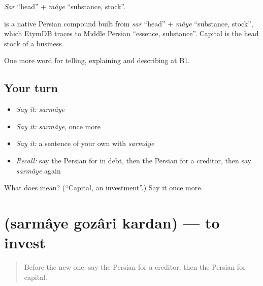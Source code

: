 \emph{Sar} \textquotedblleft{}head\textquotedblright{} + \emph{mâye} \textquotedblleft{}substance, stock\textquotedblright{}.

\begin{cousinweb}
\textbf{} is a native Persian compound built from \emph{sar} \textquotedblleft{}head\textquotedblright{} + \emph{mâye} \textquotedblleft{}substance, stock\textquotedblright{}, which EtymDB traces to Middle Persian \textquotedblleft{}essence, substance\textquotedblright{}. Capital is the head stock of a business.
\end{cousinweb}

\begin{grammarlens}[title={What you've built}]
One more word for telling, explaining and describing at B1.
\end{grammarlens}

\subsection*{Your turn}
\begin{itemize}
\raggedright
  \item \emph{Say it:} \emph{sarmâye}
  \item \emph{Say it:} \emph{sarmâye}, once more
  \item \emph{Say it:} a sentence of your own with \emph{sarmâye}
  \item \emph{Recall:} say the Persian for in debt, then the Persian for a creditor, then say \emph{sarmâye} again
\end{itemize}

\begin{tcolorbox}[breakable,colback=teal!4,colframe=teal!35!black,title={Before you move on}]
What does  mean? (\textquotedblleft{}Capital, an investment\textquotedblright{}.) Say it once more.
\end{tcolorbox}
\section[\texorpdfstring{\fa{سرمایه} \fa{گذاری} \fa{کردن} (sarmâye gozâri …)}{سرمایه گذاری کردن (sarmâye gozâri …)}]{   (sarmâye gozâri kardan) — to invest}

\label{lesson:FA-C412-sarmaye-gozari-kardan}



\begin{quote}
Before the new one: say the Persian for a creditor, then the Persian for capital.
\end{quote}

